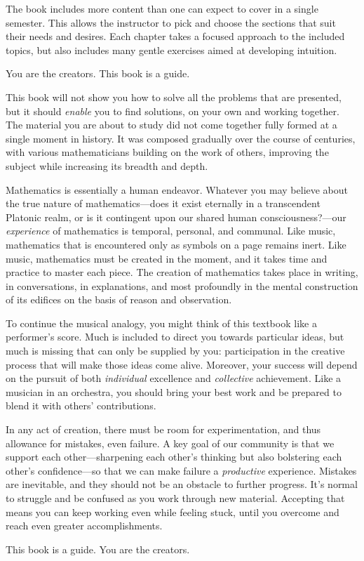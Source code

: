The book includes more content than one can expect to cover in a single semester. This allows the instructor to pick and choose the sections that suit their needs and desires. Each chapter takes a focused approach to the included topics, but also includes many gentle exercises aimed at developing intuition.


You are the creators. This book is a guide.

This book will not show you how to solve all the problems that are presented, but it should \emph{enable} you to find solutions, on your own and working together. The material you are about to study did not come together fully formed at a single moment in history. It was composed gradually over the course of centuries, with various mathematicians building on the work of others, improving the subject while increasing its breadth and depth.

Mathematics is essentially a human endeavor. Whatever you may believe about the true nature of mathematics---does it exist eternally in a transcendent Platonic realm, or is it contingent upon our shared human consciousness?---our \emph{experience} of mathematics is temporal, personal, and communal. Like music, mathematics that is encountered only as symbols on a page remains inert. Like music, mathematics must be created in the moment, and it takes time and practice to master each piece. The creation of mathematics takes place in writing, in conversations, in explanations, and most profoundly in the mental construction of its edifices on the basis of reason and observation.

To continue the musical analogy, you might think of this textbook like a performer's score. Much is included to direct you towards particular ideas, but much is missing that can only be supplied by you: participation in the creative process that will make those ideas come alive. Moreover, your success will depend on the pursuit of both \emph{individual} excellence and \emph{collective} achievement. Like a musician in an orchestra, you should bring your best work and be prepared to blend it with others' contributions.

In any act of creation, there must be room for experimentation, and thus allowance for mistakes, even failure. A key goal of our community is that we support each other---sharpening each other's thinking but also bolstering each other's confidence---so that we can make failure a \emph{productive} experience. Mistakes are inevitable, and they should not be an obstacle to further progress. It's normal to struggle and be confused as you work through new material. Accepting that means you can keep working even while feeling stuck, until you overcome and reach even greater accomplishments.

This book is a guide. You are the creators.